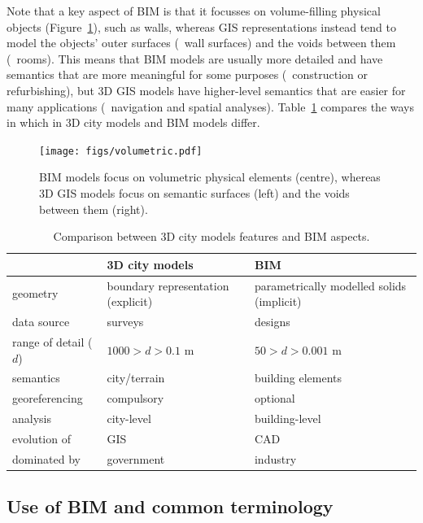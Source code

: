 Note that a key aspect of BIM is that it focusses on volume-filling physical objects (Figure~\ref{fig:volumetric}), such as walls, whereas GIS representations instead tend to model the objects' outer surfaces (\eg\ wall surfaces) and the voids between them (\eg\ rooms).
This means that BIM models are usually more detailed and have semantics that are more meaningful for some purposes (\eg\ construction or refurbishing), but 3D GIS models have higher-level semantics that are easier for many applications (\eg\  navigation and spatial analyses).
Table~\ref{tab:vs} compares the ways in which in 3D city models and BIM models differ.

\begin{figure}
\centering
\texttt{[image: figs/volumetric.pdf]}
\caption{BIM models focus on volumetric physical elements (centre), whereas 3D GIS models focus on semantic surfaces (left) and the voids between them (right).}%
\label{fig:volumetric}
\end{figure}

\begin{table}
	\centering
	\small
	\begin{tabular}{m{2.3cm}m{3.5cm}m{3.5cm}}
		\toprule
		& \textbf{3D city models} & \textbf{BIM}  \\ \midrule
		geometry & boundary representation (explicit) & parametrically modelled solids (implicit) \\ \addlinespace 
		data source & surveys & designs \\ \addlinespace 
		range of detail ($d$) & $1000>d>0.1$ m & $50>d>0.001$ m \\ \addlinespace 
		semantics & city/terrain & building elements  \\ \addlinespace 
		georeferencing & compulsory & optional  \\ \addlinespace 
		analysis & city-level & building-level \\ \addlinespace 
		evolution of & GIS & CAD \\ \addlinespace 
		dominated by & government & industry \\ \bottomrule
	\end{tabular}
	\caption{Comparison between 3D city models features and BIM aspects.}%
	\label{tab:vs}
\end{table}

\subsection{Use of BIM and common terminology}

